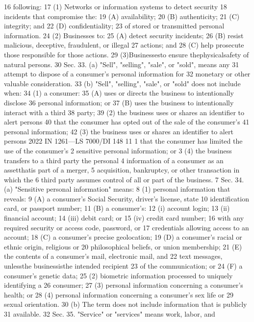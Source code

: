 16 following:
17 (1) Networks or information systems to detect security
18 incidents that compromise the:
19 (A) availability;
20 (B) authenticity;
21 (C) integrity; and
22 (D) confidentiality;
23 of stored or transmitted personal information.
24 (2) Businesses to:
25 (A) detect security incidents;
26 (B) resist malicious, deceptive, fraudulent, or illegal
27 actions; and
28 (C) help prosecute those responsible for those actions.
29 (3)Businessesto ensure thephysicalsafety of natural persons.
30 Sec. 33. (a) "Sell", "selling", "sale", or "sold", means any
31 attempt to dispose of a consumer's personal information for
32 monetary or other valuable consideration.
33 (b) "Sell", "selling", "sale", or "sold" does not include when:
34 (1) a consumer:
35 (A) uses or directs the business to intentionally disclose
36 personal information; or
37 (B) uses the business to intentionally interact with a third
38 party;
39 (2) the business uses or shares an identifier to alert persons
40 that the consumer has opted out of the sale of the consumer's
41 personal information;
42 (3) the business uses or shares an identifier to alert persons
2022 IN 1261—LS 7000/DI 148
11
1 that the consumer has limited the use of the consumer's
2 sensitive personal information; or
3 (4) the business transfers to a third party the personal
4 information of a consumer as an assetthatis part of a merger,
5 acquisition, bankruptcy, or other transaction in which the
6 third party assumes control of all or part of the business.
7 Sec. 34. (a) "Sensitive personal information" means:
8 (1) personal information that reveals:
9 (A) a consumer's Social Security, driver's license, state
10 identification card, or passport number;
11 (B) a consumer's:
12 (i) account login;
13 (ii) financial account;
14 (iii) debit card; or
15 (iv) credit card number;
16 with any required security or access code, password, or
17 credentials allowing access to an account;
18 (C) a consumer's precise geolocation;
19 (D) a consumer's racial or ethnic origin, religious or
20 philosophical beliefs, or union membership;
21 (E) the contents of a consumer's mail, electronic mail, and
22 text messages, unlessthe businessisthe intended recipient
23 of the communication; or
24 (F) a consumer's genetic data;
25 (2) biometric information processed to uniquely identifying a
26 consumer;
27 (3) personal information concerning a consumer's health; or
28 (4) personal information concerning a consumer's sex life or
29 sexual orientation.
30 (b) The term does not include information that is publicly
31 available.
32 Sec. 35. "Service" or "services" means work, labor, and
